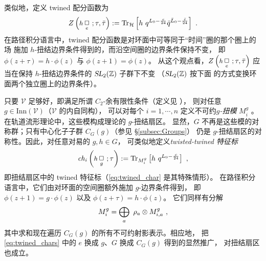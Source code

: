 
类似地，定义 twined 配分函数为
\begin{equation}
\label{eq:twined_part_def}
Z\left(\mbox{\fontsize{9}{10}\selectfont $h\,$}\underset{e}{\Box}~;\t,\bar{\t}\right):=\tr_{\mathcal{H}} \left[h~q^{L_0-\frac{c}{24}}\bar{q}^{\bar{L}_0-\frac{\bar{c}}{24}} \right]~.
\end{equation}
在路径积分语言中，twined 配分函数是对环面中可等同于“时间”圈的那个圈上的场
施加 $h$-扭结边界条件得到的，而沿空间圈的边界条件保持不变，
即 $\phi(z+\tau)=h\cdot\phi(z)$ 与 $\phi(z+1)=\phi(z)$。
从这个观点看，$Z\left(\mbox{\fontsize{9}{10}\selectfont $h\,$}\underset{e}{\Box}~;\t,\bar{\t}\right)$
应当在保持 $h$-扭结边界条件的 $\operatorname{\textsl{SL}}_2(\mathbb{Z})$ 子群下不变
（$\operatorname{\textsl{SL}}_2(\mathbb{Z})$ 按下面  的方式变换环面两个独立圈上的边界条件）。

只要 $\mathcal{V}$ 足够好，即满足所谓 $C_2$-余有限性条件（定义见 \cite{MR2201600}），
则对任意 $g\in\text{Inn}(\mathcal{V})$（$\mathcal{V}$ 的内自同构），
可以对每个 $i=1,\cdots,n$ 定义不可约\emph{$g$-扭模} $M^g_i$ \cite{Dong2000}。
在轨道流形理论中，这些模构成理论的 $g$-扭结扇区。
显然，$G$ 不再是这些模的对称群；只有中心化子子群 $C_G(g)$（参见 \S\ref{subsec:Groups}）
仍是 $g$-扭结扇区的对称性。因此，对任意对易的 $g,h\in G$，
可类似地定义\emph{twisted-twined 特征标}
\begin{equation}
\label{eq:twisted-twined_char}
{\it ch}_i\left(\mbox{\fontsize{9}{10}\selectfont $h\,$}\underset{g}{\Box}~;\t\right):=\tr_{M^g_i}\left[h~q^{L_0-\frac{c}{24}}\right]~,
\end{equation}
即扭结扇区中的 twined 特征标（\eqref{eq:twined_char} 是其特殊情形）。
在路径积分语言中，它们由对环面的空间圈额外施加 $g$-边界条件得到，
即 $\phi(z+1)=g\cdot \phi(z)$ 以及 $\phi(z+\tau)=h\cdot \phi(z)$。
它们同样有分解
\begin{equation}
M_i^g=\bigoplus_a~\rho_a\otimes M_{i,a}^g~,
\end{equation}
其中求和现在遍历 $C_G(g)$ 的所有不可约射影表示。相应地，
把 \eqref{eq:twined_chars} 中的 $e$ 换成 $g$、$G$ 换成 $C_G(g)$ 得到的显然推广，
对扭结扇区也成立。


